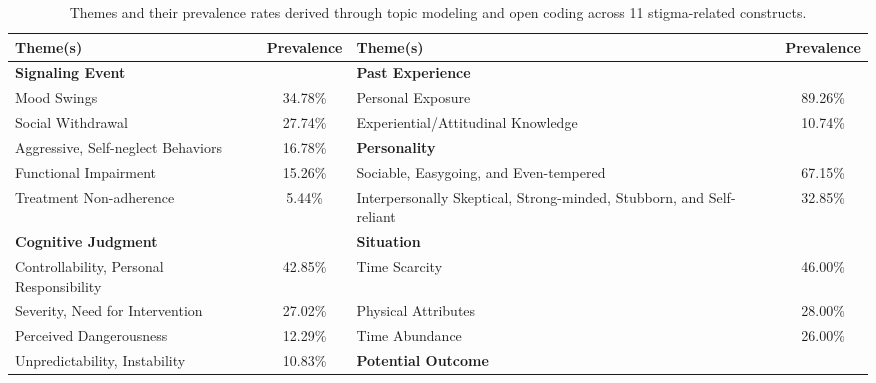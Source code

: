 \begin{table*}[htbp]
  \centering
  \small
  \caption{Themes and their prevalence rates derived through topic modeling and open coding across 11 stigma-related constructs.}
    \begin{tabular}{p{16.70em}clc}
    \toprule
    \textbf{Theme(s)} & \multicolumn{1}{p{5em}}{\textbf{Prevalence}} & \multicolumn{1}{p{16.70em}}{\textbf{Theme(s)}} & \multicolumn{1}{p{5em}}{\textbf{Prevalence}} \\
    \midrule
    \multicolumn{2}{p{16.70em}}{\textbf{Signaling Event}} & \multicolumn{2}{p{16.70em}}{\textbf{Past Experience}} \\
    \midrule
    Mood Swings & 34.78\% & \multicolumn{1}{p{16.70em}}{Personal Exposure} & 89.26\% \\[3.9pt]
    Social Withdrawal & 27.74\% & \multicolumn{1}{p{16.70em}}{Experiential/Attitudinal Knowledge} & 10.74\% \\
\cmidrule{3-4}    Aggressive, Self-neglect Behaviors & 16.78\% & \multicolumn{2}{p{16.70em}}{\textbf{Personality}} \\
\cmidrule{3-4}    Functional Impairment & 15.26\% & \multicolumn{1}{p{16.70em}}{Sociable, Easygoing, and Even-tempered} & 67.15\% \\[3.9pt]
    Treatment Non-adherence & 5.44\% & \multicolumn{1}{p{16.70em}}{Interpersonally Skeptical, Strong-minded, Stubborn, and Self-reliant} & 32.85\% \\
    \midrule
    \multicolumn{2}{p{16.70em}}{\textbf{Cognitive Judgment}} & \multicolumn{2}{p{16.70em}}{\textbf{Situation}} \\
    \midrule
    Controllability, Personal Responsibility & 42.85\% & \multicolumn{1}{p{16.70em}}{Time Scarcity} & 46.00\% \\[3.9pt]
    Severity, Need for Intervention & 27.02\% & \multicolumn{1}{p{16.70em}}{Physical Attributes} & 28.00\% \\[3.9pt]
    Perceived Dangerousness & 12.29\% & \multicolumn{1}{p{16.70em}}{Time Abundance} & 26.00\% \\
\cmidrule{3-4}    Unpredictability, Instability & 10.83\% & \multicolumn{2}{p{16.70em}}{\textbf{Potential Outcome}} \\

\end{tabular}
\end{table*}
